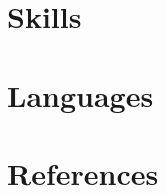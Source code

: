 \documentclass[a4paper,11pt]{article}
\begin{document}
% 
% 
% 
% 

\section{Skills}


\section{Languages}



\section{References}

\end{document}
